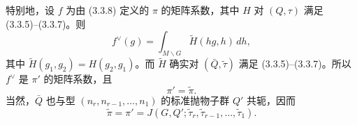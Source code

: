 特别地，设 $f$ 为由 (3.3.8) 定义的 $\pi$ 的矩阵系数，其中 $H$ 对 $(Q,\tau)$ 满足 (3.3.5)--(3.3.7)。则
\begin{equation}
f^\vee(g)=\int_{M\backslash G}\widetilde H(hg,h)\,dh,\tag{3.3.11}
\end{equation}
其中 $\widetilde H(g_1,g_2)=H(g_2,g_1)$。而 $\widetilde H$ 确实对 $(\bar Q,\widetilde\tau)$ 满足 (3.3.5)--(3.3.7)。所以 $f^\vee$ 是 $\pi'$ 的矩阵系数，且
\begin{equation}
\pi'=\widetilde\pi.\tag{3.3.12}
\end{equation}
当然，$\bar Q$ 也与型 $(n_r,n_{r-1},\ldots,n_1)$ 的标准抛物子群 $Q'$ 共轭，因而
\begin{equation}
\widetilde\pi=\pi'=J(G,Q';\widetilde\tau_r,\widetilde\tau_{r-1},\ldots,\widetilde\tau_1).\tag{3.3.13}
\end{equation}


